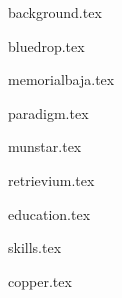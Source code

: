 \documentclass[11pt]{article}
\begin{document}
{background.tex}


{bluedrop.tex}

{memorialbaja.tex}

{paradigm.tex}

{munstar.tex}

{retrievium.tex}



{education.tex}


{skills.tex}


{copper.tex}


\end{document}
